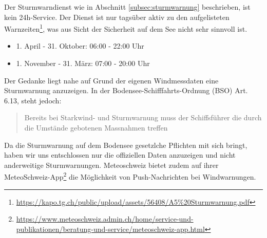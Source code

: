 Der Sturmwarndienst wie in Abschnitt \ref{subsec:sturmwarnung} beschrieben, ist kein 24h-Service. Der Dienst ist nur tagsüber aktiv zu den aufgelisteten Warnzeiten\footnote{ \url{https://kapo.tg.ch/public/upload/assets/56408/A5\%20Sturmwarnung.pdf}}, was aus Sicht der Sicherheit auf dem See nicht sehr sinnvoll ist.

\begin{itemize}
\item 1. April - 31. Oktober: 06:00 - 22:00 Uhr
\item 1. November - 31. März: 07:00 - 20:00 Uhr
\end{itemize}

\noindent
Der Gedanke liegt nahe auf Grund der eigenen Windmessdaten eine Sturmwarnung anzuzeigen. In der Bodensee-Schifffahrts-Ordnung (BSO) Art. 6.13, steht jedoch:

\begin{quote}
\flqq Bereits bei Starkwind- und Sturmwarnung muss der Schiffsführer die durch die Umstände gebotenen Massnahmen treffen \frqq
\end{quote}

\noindent
 Da die Sturmwarnung auf dem Bodensee gesetzlche Pflichten mit sich bringt, haben wir uns entschlossen nur die offiziellen Daten anzuzeigen und nicht anderweitige Sturmwarnungen. Meteoschweiz bietet zudem auf ihrer MeteoSchweiz-App\footnote{ \url{https://www.meteoschweiz.admin.ch/home/service-und-publikationen/beratung-und-service/meteoschweiz-app.html}} die Möglichkeit von Push-Nachrichten bei Windwarnungen.









